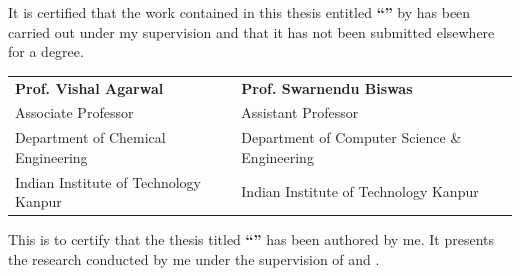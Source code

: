 \documentclass[11pt, a4paper, oneside]{Thesis} %
\begin{document}
\begin{minipage}{1.03\textwidth}
    
    It is certified that the work contained in this thesis entitled \textbf{\enquote{\ttitle}} by \textbf{\authornames} has been carried out under my supervision and that it has not been submitted elsewhere for a degree.
        
\end{minipage}

\vspace{45mm}

\begin{tabular}{@{}p{}@{}p{}@{}}
    \textbf{Prof. Vishal Agarwal} & \textbf{Prof. Swarnendu Biswas} \\
    Associate Professor & Assistant Professor \\
    Department of Chemical Engineering & Department of Computer Science \& Engineering \\
    Indian Institute of Technology Kanpur & Indian Institute of Technology Kanpur \\
\end{tabular}

\vfill
\clearpage %

This is to certify that the thesis titled \textbf{``\ttitle''} has been authored by me. It presents the research conducted by me under the supervision of \textbf{\supnameA} and \textbf{\supnameB}.\par
\end{document}
